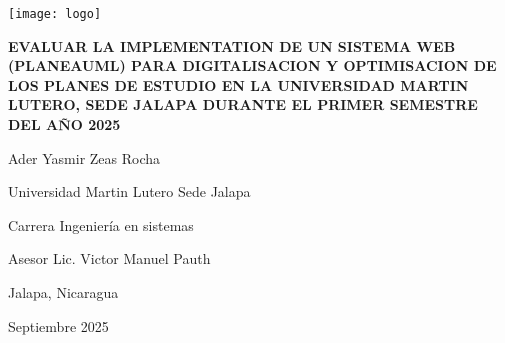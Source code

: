 \begin{titlepage}
    \centering
    \singlespacing
    
    \vspace*{0.3in}
    \texttt{[image: logo]} %
    \vspace{0.5in}
    
    {\Large \textbf{EVALUAR LA IMPLEMENTATION DE UN SISTEMA WEB (PLANEAUML) PARA DIGITALISACION Y OPTIMISACION DE LOS PLANES DE ESTUDIO EN LA UNIVERSIDAD MARTIN LUTERO, SEDE JALAPA DURANTE EL PRIMER SEMESTRE DEL AÑO 2025} \par}
    
    \vspace{1.5in}
    
    {\large Ader Yasmir Zeas Rocha \par}

    \vspace{0.5\baselineskip}

    {\large Universidad Martin Lutero Sede Jalapa \par}

    \vspace{0.5\baselineskip}

    {\large Carrera Ingeniería en sistemas \par}

    \vspace{0.5\baselineskip}

    {\large Asesor Lic. Victor Manuel Pauth \par}

    \vspace{0.5\baselineskip}

    {\large Jalapa, Nicaragua \par}

    \vspace{0.5\baselineskip}

    {\large Septiembre 2025 \par}
    
\end{titlepage}